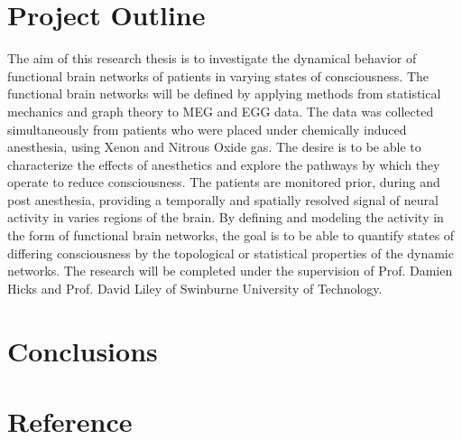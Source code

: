 \documentclass{article}
\begin{document}
\section{Project Outline}
The aim of this research thesis is to investigate the dynamical behavior of functional brain networks of patients in varying states of consciousness. The functional brain networks will be defined by applying methods from statistical mechanics and graph theory to MEG and EGG data. The data was collected simultaneously from patients who were placed under chemically induced anesthesia, using Xenon and Nitrous Oxide gas. The desire is to be able to characterize the effects of anesthetics and explore the pathways by which they operate to reduce consciousness. The patients are monitored prior, during and post anesthesia, providing a temporally and spatially resolved signal of neural activity in varies regions of the brain. By defining and modeling the activity in the form of functional brain networks, the goal is to be able to quantify states of differing consciousness by the topological or statistical properties of the dynamic networks. The research will be completed under the supervision of Prof. Damien Hicks and Prof. David Liley of Swinburne University of Technology.

\section{Conclusions}

\section{Reference}

\cite{zart}

\nocite{*}


\end{document}
